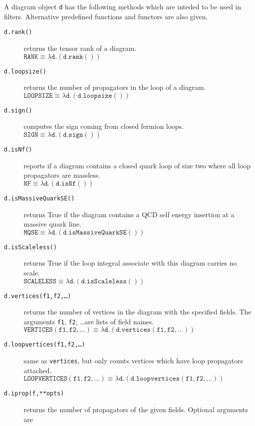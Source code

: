 \documentclass[11pt,a4paper]{refrep}
\begin{document}
A diagram object \texttt{d} has the following methods which are inteded
to be used in filters.
Alternative predefined functions and functors are also given.
\begin{description}
\item[\texttt{d.rank()}] returns the tensor rank of a diagram.\\
   $\mathtt{RANK}\equiv\lambda\mathtt{d}.(\mathtt{d.rank()})$
\item[\texttt{d.loopsize()}] returns the number of propagators
   in the loop of a diagram.\\
   $\mathtt{LOOPSIZE}\equiv\lambda\mathtt{d}.(\mathtt{d.loopsize()})$
\item[\texttt{d.sign()}] computes the sign coming from closed
   fermion loops.\\
   $\mathtt{SIGN}\equiv\lambda\mathtt{d}.(\mathtt{d.sign()})$
\item[\texttt{d.isNf()}] reports if a diagram contains a closed
   quark loop of size two where all loop propagators are massless.\\
   $\mathtt{NF}\equiv\lambda\mathtt{d}.(\mathtt{d.isNf()})$
\item[\texttt{d.isMassiveQuarkSE()}] returns True if the diagram
   contains a QCD self energy insertion at a massive quark line.\\
   $\mathtt{MQSE}\equiv\lambda\mathtt{d}.(\mathtt{d.isMassiveQuarkSE()})$
\item[\texttt{d.isScaleless()}] returns True if the loop integral associate
   with this diagram carries no scale.\\
   $\mathtt{SCALELESS}\equiv\lambda\mathtt{d}.(\mathtt{d.isScaleless()})$
\item[\texttt{d.vertices(f1,f2,\ldots)}] returns the number of vertices
   in the diagram with the specified fields. The arguments \texttt{f1},
   \texttt{f2}, \dots are lists of field names.\\
   $\mathtt{VERTICES(f1,f2,\ldots)}\equiv
    \lambda\mathtt{d}.(\mathtt{d.vertices(\mathtt{f1},\mathtt{f2},\ldots)})$
\item[\texttt{d.loopvertices(f1,f2,\ldots)}]
   same as \texttt{vertices}, but only counts vertices which have
   loop propagators attached.\\
   $\mathtt{LOOPVERTICES(f1,f2,\ldots)}\equiv
    \lambda\mathtt{d}.(\mathtt{d.loopvertices(
    \mathtt{f1},\mathtt{f2},\ldots)})$
\item[\texttt{d.iprop(f,**opts)}] returns the number of propagators
   of the given fields. Optional arguments are

\end{description}
\end{document}
